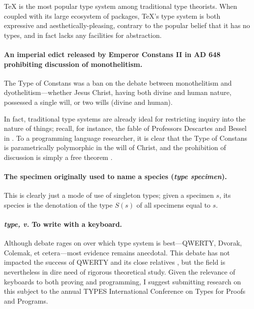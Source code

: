 \documentclass[10pt]{article}
\begin{document}
\TeX{} is the most popular type system among traditional type theorists. When
coupled with its large ecosystem of packages, \TeX{}'s type system is both
expressive and aesthetically-pleasing, contrary to the popular belief that it
has no types, and in fact lacks any facilities for abstraction.

\paragraph{An imperial edict released by Emperor Constans II in AD 648
prohibiting discussion of monothelitism.}

The Type of Constans was a ban on the debate between monothelitism and
dyothelitism---whether Jesus Christ, having both divine and human nature,
possessed a single will, or two wills (divine and human).

In fact, traditional type systems are already ideal for restricting inquiry into
the nature of things; recall, for instance, the fable of Professors Descartes
and Bessel in \citet{reynolds83}. To a programming language researcher, it is
clear that the Type of Constans is parametrically polymorphic in the will of
Christ, and the prohibition of discussion is simply a free theorem
\citep{wadler89}.

\paragraph{The specimen originally used to name a species (\emph{type
specimen}).}

This is clearly just a mode of use of singleton types; given a specimen $s$, its
species is the denotation of the type $S(s)$ of all specimens equal to $s$.

\paragraph{\emph{type, v.} To write with a keyboard.}

Although debate rages on over which type system is best---QWERTY, Dvorak,
Colemak, et cetera---most evidence remains anecdotal. This debate has not
impacted the success of QWERTY and its close relatives \citep{noyes83}, but the
field is nevertheless in dire need of rigorous theoretical study. Given the
relevance of keyboards to both proving and programming, I suggest submitting
research on this subject to the annual TYPES International Conference on Types
for Proofs and Programs.

\printbibliography
\end{document}
